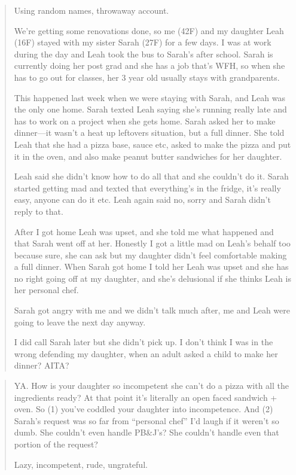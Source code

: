 \begin{quote}
Using random names, throwaway account.

We're getting some renovations done, so me (42F) and my daughter Leah
(16F) stayed with my sister Sarah (27F) for a few days. I was at work
during the day and Leah took the bus to Sarah's after school. Sarah is
currently doing her post grad and she has a job that's WFH, so when she
has to go out for classes, her 3 year old usually stays with
grandparents.

This happened last week when we were staying with Sarah, and Leah was
the only one home. Sarah texted Leah saying she's running really late
and has to work on a project when she gets home. Sarah asked her to
make dinner---it wasn't a heat up leftovers situation, but a full
dinner. She told Leah that she had a pizza base, sauce etc, asked to
make the pizza and put it in the oven, and also make peanut butter
sandwiches for her daughter.

Leah said she didn't know how to do all that and she couldn't do it.
Sarah started getting mad and texted that everything's in the fridge,
it's really easy, anyone can do it etc. Leah again said no, sorry and
Sarah didn't reply to that.

After I got home Leah was upset, and she told me what happened and that
Sarah went off at her. Honestly I got a little mad on Leah's behalf too
because sure, she can ask but my daughter didn't feel comfortable
making a full dinner. When Sarah got home I told her Leah was upset and
she has no right going off at my daughter, and she's delusional if she
thinks Leah is her personal chef.

Sarah got angry with me and we didn't talk much after, me and Leah were
going to leave the next day anyway.

I did call Sarah later but she didn't pick up. I don't think I was in
the wrong defending my daughter, when an adult asked a child to make
her dinner? AITA?
\end{quote}


\begin{quote}
YA. How is your daughter so incompetent she can't do a pizza with all
the ingredients ready? At that point it's literally an open faced
sandwich + oven. So (1) you've coddled your daughter into incompetence.
And (2) Sarah's request was so far from ``personal chef'' I'd laugh if
it weren't so dumb. She couldn't even handle PB\&J's? She couldn't
handle even that portion of the request?

Lazy, incompetent, rude, ungrateful.
\end{quote}

